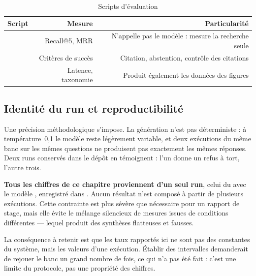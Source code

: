 \begin{table}[htbp]
  \centering
  \caption{Scripts d'évaluation}
  \label{tab:scripts}
  \small
  \begin{tabularx}{\textwidth}{@{}>{\raggedright\arraybackslash}p{3.7cm} R R@{}}
    \toprule
    \sffamily\bfseries\color{navy}Script &
    \sffamily\bfseries\color{navy}Mesure &
    \sffamily\bfseries\color{navy}Particularité \\
    \midrule
            & Recall@5, MRR
                                 & N'appelle pas le modèle : mesure la recherche seule \\
     & Critères de succès
                                 & Citation, abstention, contrôle des citations \\
        & Latence, taxonomie
                                 & Produit également les données des figures \\
    \bottomrule
  \end{tabularx}
\end{table}

\subsection{Identité du run et reproductibilité}

Une précision méthodologique s'impose. La génération n'est pas déterministe : à température~0,1 le
modèle reste légèrement variable, et deux exécutions du même banc sur les mêmes questions ne
produisent pas exactement les mêmes réponses. Deux runs conservés dans le dépôt en témoignent :
l'un donne un refus à tort, l'autre trois.

\textbf{Tous les chiffres de ce chapitre proviennent d'un seul run}, celui du \DateMesure{} avec
le modèle \ModeleLLM{}, enregistré dans . Aucun résultat
n'est composé à partir de plusieurs exécutions. Cette contrainte est plus sévère que nécessaire
pour un rapport de stage, mais elle évite le mélange silencieux de mesures issues de conditions
différentes --- lequel produit des synthèses flatteuses et fausses.

\begin{limite}
La conséquence à retenir est que les taux rapportés ici ne sont pas des constantes du système,
mais les valeurs d'une exécution. Établir des intervalles demanderait de rejouer le banc un grand
nombre de fois, ce qui n'a pas été fait : c'est une limite du protocole, pas une propriété des
chiffres.
\end{limite}

